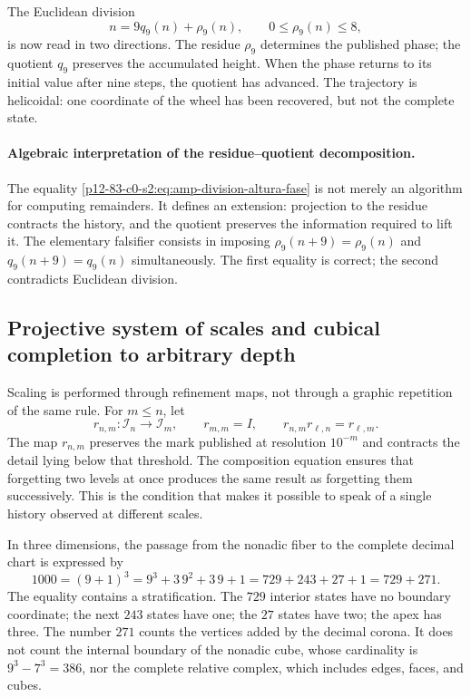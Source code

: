 The Euclidean division
\begin{equation}\label{p12-83-c0-s2:eq:amp-division-altura-fase}
 n=9q_9(n)+\rho_9(n),
 \qquad 0\leq\rho_9(n)\leq8,
\end{equation}
is now read in two directions. The residue \(\rho_9\) determines the published phase;
the quotient \(q_9\) preserves the accumulated height. When the phase
returns to its initial value after nine steps, the quotient has advanced.
The trajectory is helicoidal: one coordinate of the wheel has been recovered,
but not the complete state.

\paragraph{Algebraic interpretation of the residue–quotient decomposition.}
The equality \eqref{p12-83-c0-s2:eq:amp-division-altura-fase} is not merely an algorithm for computing remainders. It defines an extension: projection to the residue contracts the history, and the quotient preserves the information required to lift it. The elementary falsifier consists in imposing \(\rho_9(n+9)=\rho_9(n)\) and \(q_9(n+9)=q_9(n)\) simultaneously. The first equality is correct; the second contradicts Euclidean division.

\subsection{Projective system of scales and cubical completion to arbitrary depth}

Scaling is performed through refinement maps, not through a
graphic repetition of the same rule. For \(m\leq n\), let
\begin{equation}\label{p12-83-c0-s2:eq:amp-refinamiento-escalas}
 r_{n,m}:\mathcal I_n\longrightarrow\mathcal I_m,
 \qquad
 r_{m,m}=I,
 \qquad
 r_{n,m}r_{\ell,n}=r_{\ell,m}.
\end{equation}
The map \(r_{n,m}\) preserves the mark published at resolution \(10^{-m}\) and
contracts the detail lying below that threshold. The composition
equation ensures that forgetting two levels at once produces the same
result as forgetting them successively. This is the condition that makes it possible
to speak of a single history observed at different scales.

In three dimensions, the passage from the nonadic fiber to the complete decimal chart
is expressed by
\begin{equation}\label{p12-83-c0-s2:eq:amp-729-271-1000}
 1000=(9+1)^3=9^3+3\,9^2+3\,9+1
 =729+243+27+1=729+271.
\end{equation}
The equality contains a stratification. The \(729\) interior states
have no boundary coordinate; the next \(243\) states have one;
the \(27\) states have two; the apex has three. The number \(271\) counts the vertices
added by the decimal corona. It does not count the internal boundary of the
nonadic cube, whose cardinality is \(9^3-7^3=386\), nor the complete relative complex,
which includes edges, faces, and cubes.

